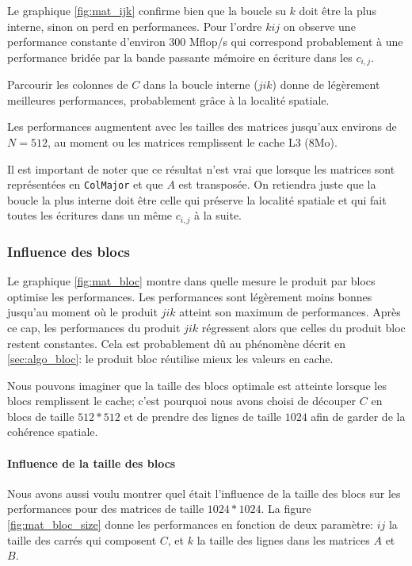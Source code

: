 Le graphique \ref{fig:mat_ijk} confirme bien que la boucle su $k$ doit être la plus interne, sinon on perd en performances. Pour l'ordre $kij$ on observe une performance constante d'environ 300 Mflop/s qui correspond probablement à une performance bridée par la bande passante mémoire en écriture dans les $c_{i,j}$.
    
Parcourir les colonnes de $C$ dans la boucle interne ($jik$) donne de légèrement meilleures performances, probablement grâce à la localité spatiale.
    
Les performances augmentent avec les tailles des matrices jusqu'aux environs de $N=512$, au moment ou les matrices remplissent le cache L3 (8Mo).
    
Il est important de noter que ce résultat n'est vrai que lorsque les matrices sont représentées en \texttt{ColMajor} et que $A$ est transposée. On retiendra juste que la boucle la plus interne doit être celle qui préserve la localité spatiale et qui fait toutes les écritures dans un même $c_{i,j}$ à la suite.


\subsubsection{Influence des blocs}

Le graphique \ref{fig:mat_bloc} montre dans quelle mesure le produit par blocs optimise les performances. Les performances sont légèrement moins bonnes jusqu'au moment où le produit $jik$ atteint son maximum de performances. Après ce cap, les performances du produit $jik$ régressent alors que celles du produit bloc restent constantes. Cela est probablement dû au phénomène décrit en \ref{sec:algo_bloc}: le produit bloc réutilise mieux les valeurs en cache.
    
Nous pouvons imaginer que la taille des blocs optimale est atteinte lorsque les blocs remplissent le cache; c'est pourquoi nous avons choisi de découper $C$ en blocs de taille $512*512$ et de prendre des lignes de taille $1024$ afin de garder de la cohérence spatiale.
    
\paragraph{Influence de la taille des blocs}
    
Nous avons aussi voulu montrer quel était l'influence de la taille des blocs sur les performances pour des matrices de taille $1024*1024$. La figure \ref{fig:mat_bloc_size} donne les performances en fonction de deux paramètre: $ij$ la taille des carrés qui composent $C$, et $k$ la taille des lignes dans les matrices $A$ et $B$. 
    
